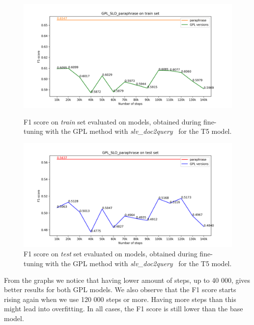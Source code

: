 \documentclass[fleqn,moreauthors,10pt]{ds_report}
\begin{document}
\begin{figure}
    \centering
    \begin{minipage}{0.5\textwidth}
        \centering
        \includegraphics[width=\linewidth]{GPL_SLO__paraphrase_train.png}
        \caption{F1 score on \textit{train} set evaluated on models, obtained during fine-tuning with the GPL method with {\it slv\_doc2query}~\cite{boshko} for the T5 model.}
		\label{fig:gpl-slo-versions-train}
    \end{minipage}\hfill
    \begin{minipage}{0.5\textwidth}
        \centering
        \includegraphics[width=\linewidth]{GPL_SLO__paraphrase_test.png}
        \caption{F1 score on \textit{test} set evaluated on models, obtained during fine-tuning with the GPL method with {\it slv\_doc2query}~\cite{boshko} for the T5 model.}
		\label{fig:gpl-slo-versions}
    \end{minipage}
\end{figure}


From the graphs we notice that having lower amount of steps, up to 40 000, gives better results for both GPL models.
We also observe that the F1 score starts rising again when we use 120 000 steps or more. Having more steps than this
might lead into overfitting. In all cases, the F1 score is still lower than the base model.
\end{document}

